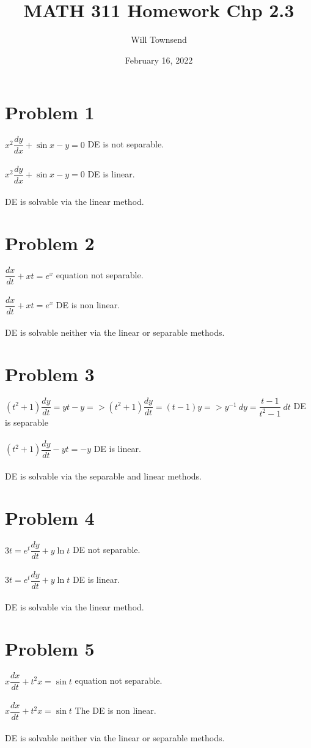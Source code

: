 \documentclass[12pt]{exam}
\title{\textbf{MATH 311 Homework Chp 2.3}}
\author{Will Townsend}
\date{February 16, 2022}
\begin{document}
\maketitle
\section*{Problem 1}
$x^2\dfrac{dy}{dx}+\sin{x}-y=0$ DE is not separable.\\\\
$x^2\dfrac{dy}{dx}+\sin{x}-y=0$ DE is linear.\\\\
DE is solvable via the linear method.
\section*{Problem 2}
$\dfrac{dx}{dt}+xt=e^x$ equation not separable.\\\\
$\dfrac{dx}{dt}+xt=e^x$ DE is non linear.\\\\
DE is solvable neither via the linear or separable methods.
\section*{Problem 3}
$(t^2+1)\dfrac{dy}{dt}=yt-y=>(t^2+1)\dfrac{dy}{dt}=(t-1)y=>{y^{-1}}\:dy=\dfrac{t-1}{t^2-1}\:dt$ DE is separable\\\\
$(t^2+1)\dfrac{dy}{dt}-yt=-y$ DE is linear.\\\\ 
DE is solvable via the separable and linear methods.
\pagebreak
\section*{Problem 4}
$3t=e^t\dfrac{dy}{dt}+y\ln{t}$ DE not separable.\\\\
$3t=e^t\dfrac{dy}{dt}+y\ln{t}$ DE is linear.\\\\
DE is solvable via the linear method.
\section*{Problem 5}
$x\dfrac{dx}{dt}+t^2x=\sin{t}$ equation not separable.\\\\
$x\dfrac{dx}{dt}+t^2x=\sin{t}$ The DE is non linear.\\\\
DE is solvable neither via the linear or separable methods.
\end{document}
